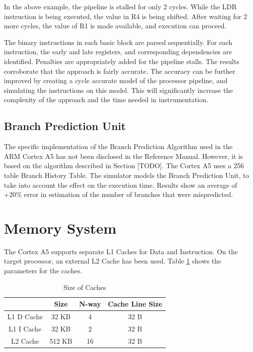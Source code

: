 In the above example, the pipeline is stalled for only 2 cycles. While the LDR instruction is being executed, the value in R4 is being shifted. After waiting for 2 more cycles, the value of R1 is made available, and execution can proceed.

The binary instructions in each basic block are parsed sequentially. For each instruction, the early and late registers, and corresponding dependencies are identified. Penalties are appropriately added for the pipeline stalls. The results corroborate that the approach is fairly accurate. The accuracy can be further improved by creating a cycle accurate model of the processor pipeline, and simulating the instructions on this model. This will significantly increase the complexity of the approach and the time needed in instrumentation.

\subsection{Branch Prediction Unit}
The specific implementation of the Branch Prediction Algorithm used in the ARM Cortex A5 has not been disclosed in the Reference Manual. However, it is based on the algorithm described in Section [TODO]. The Cortex A5 uses a 256 table Branch History Table. The simulator models the Branch Prediction Unit, to take into account the effect on the execution time. Results show an average of +20\% error in estimation of the number of branches that were mispredicted.

\section{Memory System}
\label{sec:c3CacheHierarchy}
The Cortex A5 supports separate L1 Caches for Data and Instruction. On the target processor, an external L2 Cache has been used. Table \ref{tbl:cacheSize} shows the parameters for the caches.

\begin{table}[h]
\centering
\begin{tabular}{cccc}
    \toprule
        &  Size   & N-way   & Cache Line Size \\
    \hline
    L1 D Cache  & 32 KB & 4 & 32 B \\
    L1 I Cache  & 32 KB & 2 & 32 B \\
    L2 Cache    & 512 KB & 16 & 32 B \\
    \bottomrule
\end{tabular}
\caption{Size of Caches}
\label{tbl:cacheSize}
\end{table}

